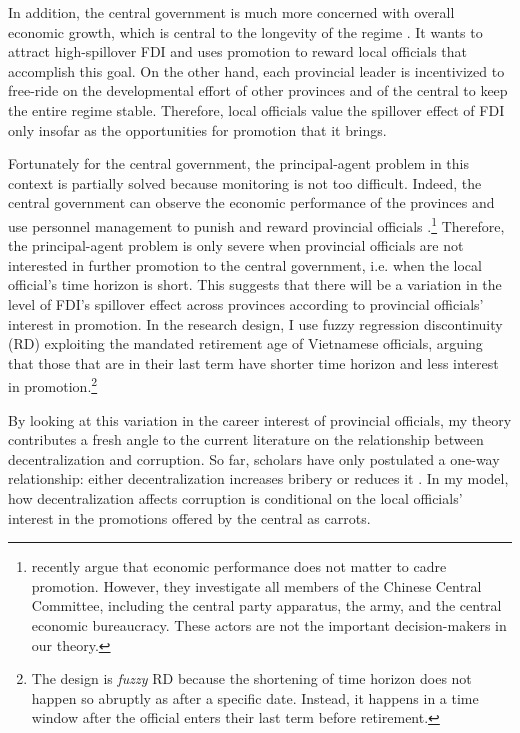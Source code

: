 In addition, the central government is much more concerned with overall economic growth, which is central to the longevity of the regime \citep{Malesky2008}. It wants to attract high-spillover FDI and uses promotion to reward local officials that accomplish this goal. On the other hand, each provincial leader is incentivized to free-ride on the developmental effort of other provinces and of the central to keep the entire regime stable. Therefore, local officials value the spillover effect of FDI only insofar as the opportunities for promotion that it brings.

Fortunately for the central government, the principal-agent problem in this context is partially solved because monitoring is not too difficult. Indeed, the central government can observe the economic performance of the provinces and use personnel management to punish and reward provincial officials \citep{Sheng2007, Li2005}.\footnote{\citet{Shih2012} recently argue that economic performance does not matter to cadre promotion. However, they investigate all members of the Chinese Central Committee, including the central party apparatus, the army, and the central economic bureaucracy. These actors are not the important decision-makers in our theory.} Therefore, the principal-agent problem is only severe when provincial officials are not interested in further promotion to the central government, i.e. when the local official's time horizon is short. This suggests that there will be a variation in the level of FDI's spillover effect across provinces according to provincial officials' interest in promotion. In the research design, I use fuzzy regression discontinuity (RD) exploiting the mandated retirement age of Vietnamese officials, arguing that those that are in their last term have shorter time horizon and less interest in promotion.\footnote{The design is \textit{fuzzy} RD because the shortening of time horizon does not happen so abruptly as after a specific date. Instead, it happens in a time window after the official enters their last term before retirement.}

By looking at this variation in the career interest of provincial officials, my theory contributes a fresh angle to the current literature on the relationship between decentralization and corruption. So far, scholars have only postulated a one-way relationship: either decentralization increases bribery \citep{Fan2009} or reduces it \citep{Guerra2009}. In my model, how decentralization affects corruption is conditional on the local officials' interest in the promotions offered by the central as carrots.


